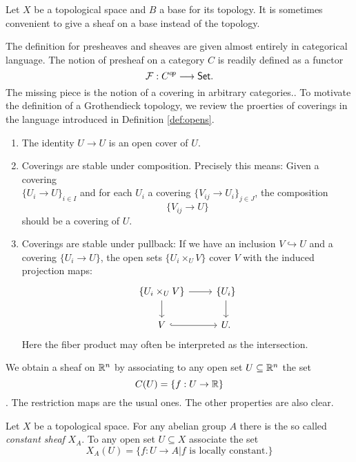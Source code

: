 Let $X$ be a topological space and $B$ a base for its topology. It is sometimes convenient to give a sheaf on a base instead of the topology.

The definition for presheaves and sheaves are given almost entirely in categorical language. The notion of presheaf on a category $C$ is readily defined as a functor 
\[\mathcal{F}: C^{o\kern-0.10em p}\longrightarrow \mathsf{Set}.\]
The missing piece is the notion of a covering in arbitrary categories.. To motivate the definition of a Grothendieck topology, we review the proerties of coverings in the language introduced in Definition \ref{def:opens}.
 \begin{enumerate}
  \item The identity $U \to U$ is an open cover of $U$.
  \item Coverings are stable under composition. Precisely this means: Given a covering \\$\{U_i \to U\}_{i \in I}$ and for each $U_i$ a covering $\{V_{ij} \to U_i\}_{j \in J}$, the composition
        \[\{V_{ij} \to U\}\]
        should be a covering of $U$.
   \item  Coverings are stable under pullback: If we have an inclusion $V \hookrightarrow U$ and a covering $\{U_i \to U\}$, the open sets $\{U_i \times_U V\}$ cover $V$ with the induced projection maps:
      \[\begin{tikzcd}
      	{\{U_i \times_U V\}} & {\{U_i\}} \\
      	V & U.
      	\arrow[from=1-1, to=2-1]
      	\arrow[from=1-1, to=1-2]
      	\arrow[from=1-2, to=2-2]
      	\arrow[hook, from=2-1, to=2-2]
      \end{tikzcd}\]
      Here the fiber product may often be interpreted as the intersection.
\end{enumerate}
\begin{definition}
  
\end{definition}

\begin{example}
  We obtain a sheaf on $\mathbb{R}^n$ by associating to any open set $U\subseteq \mathbb{R}^n$ the set \[C(U) = \{f: U \to \mathbb{R}\}\]. The restriction maps are the usual ones. The other properties are also clear.
\end{example}
\begin{example}
  Let $X$ be a topological space. For any abelian group $A$ there is the so called \textit{constant sheaf} $X_A$. To any open set $U \subseteq X$ associate the set \[X_A(U) = \{f: U \to A | f \text{ is locally constant.} \}\]
\end{example}

